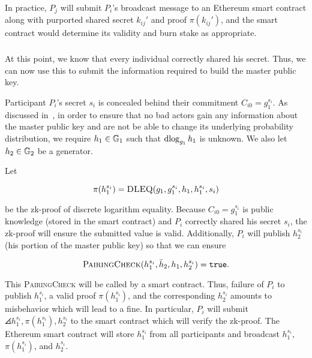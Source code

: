 In practice, $P_{j}$ will submit $P_{i}$'s broadcast message to an
Ethereum smart contract along with purported shared secret $k_{ij}'$
and proof $\pi(k_{ij}')$, and the smart contract would
determine its validity and burn stake as appropriate.





\subsubsection{\KeyShare{}}
\label{sssec:key_share_submission}
At this point, we know that every individual correctly shared his secret.
Thus, we can now use this to submit the information required
to build the master public key.

Participant $P_{i}$'s secret $s_{i}$ is concealed behind
their commitment $C_{i0} = g_{1}^{s_{i}}$.
As discussed in~\cite{gennaro3revisiting,gennaro1999secure,ethdkg},
in order to ensure that no bad actors gain any information
about the master public key and are not be able to change
its underlying probability distribution, we require
$h_{1}\in\mathbb{G}_{1}$ such that $\operatorname{dlog}_{g_{1}}h_{1}$ is unknown.
We also let $h_{2}\in\mathbb{G}_{2}$ be a generator.

Let

\begin{equation}
    \pi(h_{1}^{s_{i}}) = \textsc{DLEQ}(
        g_{1},g_{1}^{s_{i}},h_{1},h_{1}^{s_{i}},s_{i})
\end{equation}

\noindent
be the zk-proof of discrete logarithm equality.
Because $C_{i0} = g_{1}^{s_{i}}$ is public knowledge
(stored in the smart contract)
and $P_{i}$ correctly shared his secret $s_{i}$,
the zk-proof will ensure the submitted value is valid.
Additionally, $P_{i}$ will publish $h_{2}^{s_{i}}$
(his portion of the master public key)
so that we can ensure

\begin{equation}
    \textsc{PairingCheck}(h_{1}^{s_{i}},\bar{h}_{2},h_{1},h_{2}^{s_{i}})
        = \texttt{true}.
\end{equation}

\noindent
This \textsc{PairingCheck} will be called by a smart contract.
Thus, failure of $P_{i}$ to publish $h_{1}^{s_{i}}$,
a valid proof $\pi(h_{1}^{s_{i}})$, and the corresponding
$h_{2}^{s_{i}}$ amounts to misbehavior which will
lead to a fine.
In particular, $P_{i}$ will submit
$\angles{h_{1}^{s_{i}}, \pi(h_{1}^{s_{i}}), h_{2}^{s_{i}}}$
to the smart contract which will verify the zk-proof.
The Ethereum smart contract will store $h_{1}^{s_{i}}$ from
all participants and broadcast
$h_{1}^{s_{i}}$, $\pi(h_{1}^{s_{i}})$, and $h_{2}^{s_{i}}$.

